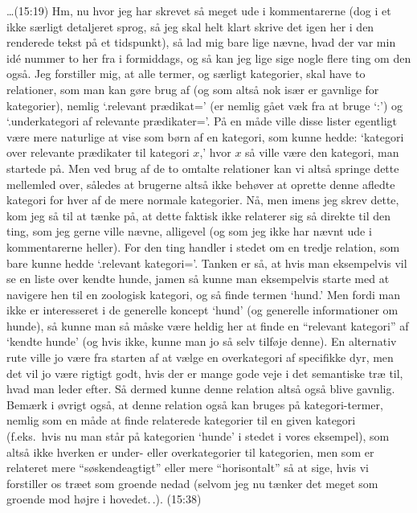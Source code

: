 \documentclass{report}
\begin{document}
\ldots (15:19) Hm, nu hvor jeg har skrevet så meget ude i kommentarerne (dog i et ikke særligt detaljeret sprog, så jeg skal helt klart skrive det igen her i den renderede tekst på et tidspunkt), så lad mig bare lige nævne, hvad der var min idé nummer to her fra i formiddags, og så kan jeg lige sige nogle flere ting om den også. Jeg forstiller mig, at alle termer, og særligt kategorier, skal have to relationer, som man kan gøre brug af (og som altså nok især er gavnlige for kategorier), nemlig `.relevant prædikat=' (er nemlig gået væk fra at bruge `:') og `.underkategori af relevante prædikater='. På en måde ville disse lister egentligt være mere naturlige at vise som børn af en kategori, som kunne hedde: `kategori over relevante prædikater til kategori $x$,' hvor $x$ så ville være den kategori, man startede på. Men ved brug af de to omtalte relationer kan vi altså springe dette mellemled over, således at brugerne altså ikke behøver at oprette denne afledte kategori for hver af de mere normale kategorier. Nå, men imens jeg skrev dette, kom jeg så til at tænke på, at dette faktisk ikke relaterer sig så direkte til den ting, som jeg gerne ville nævne, alligevel (og som jeg ikke har nævnt ude i kommentarerne heller). For den ting handler i stedet om en tredje relation, som bare kunne hedde `.relevant kategori='. Tanken er så, at hvis man eksempelvis vil se en liste over kendte hunde, jamen så kunne man eksempelvis starte med at navigere hen til en zoologisk kategori, og så finde termen `hund.' Men fordi man ikke er interesseret i de generelle koncept `hund' (og generelle informationer om hunde), så kunne man så måske være heldig her at finde en ``relevant kategori'' af `kendte hunde' (og hvis ikke, kunne man jo så selv tilføje denne). En alternativ rute ville jo være fra starten af at vælge en overkategori af specifikke dyr, men det vil jo være rigtigt godt, hvis der er mange gode veje i det semantiske træ til, hvad man leder efter. Så dermed kunne denne relation altså også blive gavnlig. Bemærk i øvrigt også, at denne relation også kan bruges på kategori-termer, nemlig som en måde at finde relaterede kategorier til en given kategori (f.eks.\ hvis nu man står på kategorien `hunde' i stedet i vores eksempel), som altså ikke hverken er under- eller overkategorier til kategorien, men som er relateret mere ``søskendeagtigt'' eller mere ``horisontalt'' så at sige, hvis vi forstiller os træet som groende nedad (selvom jeg nu tænker det meget som groende mod højre i hovedet.\,.). (15:38)
\end{document}
